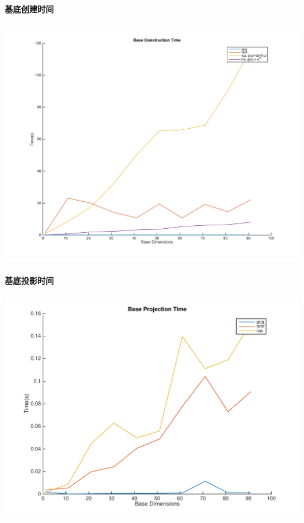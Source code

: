 \paragraph{基底创建时间}
\begin{center}
\begin{minipage}[t]{\linewidth}
\center
{
\includegraphics[width=\textwidth]{Img/pni_baseconstr} 
\label{fig:ica_base}
}
\end{minipage}
\medskip
\end{center}

\paragraph{基底投影时间}
\begin{center}
\begin{minipage}[t]{\linewidth}
\center
{
\includegraphics[width=\textwidth]{Img/pni_baseproj} 
\label{fig:ica_base}
}
\end{minipage}
\medskip
\end{center}

